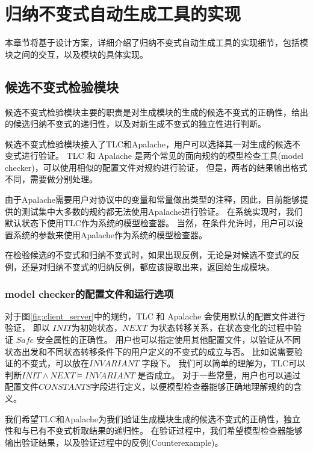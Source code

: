 \chapter{归纳不变式自动生成工具的实现}\label{chap:implementation}

本章节将基于设计方案，详细介绍了归纳不变式自动生成工具的实现细节，包括模块之间的交互，以及模块的具体实现。

\section{候选不变式检验模块}

候选不变式检验模块主要的职责是对生成模块的生成的候选不变式的正确性，给出的候选归纳不变式的递归性，以及对新生成不变式的独立性进行判断。

候选不变式检验模块接入了TLC和Apalache，用户可以选择其一对生成的候选不变式进行验证。
TLC 和 Apalache 是两个常见的面向\TLA 规约的模型检查工具(model checker)，可以使用相似的配置文件对规约进行验证，
但是，两者的结果输出格式不同，需要做分别处理。

由于Apalache需要用户对协议中的变量和常量做出类型的注释，因此，目前能够提供的测试集中大多数的规约都无法使用Apalache进行验证。
在系统实现时，我们默认状态下使用TLC作为系统的模型检查器。
当然，在条件允许时，用户可以设置系统的参数来使用Apalache作为系统的模型检查器。

在检验候选的不变式和归纳不变式时，如果出现反例，无论是对候选不变式的反例，还是对归纳不变式的归纳反例，都应该提取出来，返回给生成模块。

\subsection{model checker的配置文件和运行选项}

对于图\ref{fig:client_server}中的规约，TLC 和 Apalache 会使用默认的配置文件进行验证，
即以 $INIT$为初始状态，$NEXT$ 为状态转移关系，在状态变化的过程中验证 $Safe$ 安全属性的正确性。
用户也可以指定使用其他配置文件，以验证从不同状态出发和不同状态转移条件下的用户定义的不变式的成立与否。
比如说需要验证的不变式，可以放在$INVARIANT$ 字段下。
我们可以简单的理解为，TLC可以判断$INIT \wedge NEXT \vDash INVARIANT$ 是否成立。
对于一些常量，用户也可以通过配置文件$CONSTANTS$字段进行定义，以便模型检查器能够正确地理解规约的含义。

我们希望TLC和Apalache为我们验证生成模块生成的候选不变式的正确性，独立性和与已有不变式析取结果的递归性。
在验证过程中，我们希望模型检查器能够输出验证结果，以及验证过程中的反例(Counterexample)。


